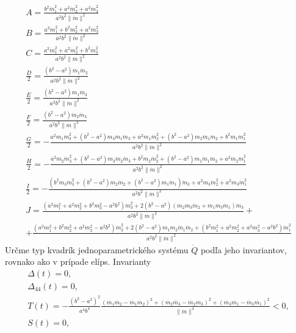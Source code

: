 \begin{gather*}
A = \frac{b^{2} \dot{m}_1^{2} + a^{2} \dot{m}_2^{2} + a^{2} \dot{m}_3^{2}}{a^2 b^2 \| \dot{m} \|^2} \\
B = \frac{a^{2} \dot{m}_1^{2} + b^{2} \dot{m}_2^{2} + a^{2} \dot{m}_3^{2}}{a^2 b^2 \| \dot{m} \|^2} \\
C = \frac{a^{2} \dot{m}_1^{2} + a^{2} \dot{m}_2^{2} + b^{2} \dot{m}_3^{2}}{a^2 b^2 \| \dot{m} \|^2}  \\ \frac{D}{2} = \frac{\left(b^2 - a^2\right)\dot{m}_1\dot{m}_2}{a^2b^2 \| \dot{m} \|^2}  \\
\frac{E}{2} = \frac{\left(b^2 - a^2\right)\dot{m}_1\dot{m}_3}{a^2b^2 \| \dot{m} \|^2} \\
\frac{F}{2} = \frac{\left(b^2 - a^2\right)\dot{m}_2\dot{m}_3}{a^2b^2 \| \dot{m} \|^2} \\
\frac{G}{2} = - \frac{ a^2 m_1 \dot{m}_3^2 + (b^2 - a^2) m_3 \dot{m}_1 \dot{m}_3 +  a^2 m_1 \dot{m}_2^2 + ( b^2 - a^2) m_2 \dot{m}_1 \dot{m}_2 + b^2 m_1 \dot{m}_1^2}{a^2b^2 \| \dot{m} \|^2} \\
\frac{H}{2} = - \frac{a^2 m_2 \dot{m}_3^2 + (b^2 - a^2) m_3 \dot{m}_2 \dot{m}_3 + b^2 m_2 \dot{m}_2^2 + (b^2 - a^2) m_1 \dot{m}_1 \dot{m}_2 + a^2 m_2 \dot{m}_1^2}{ a^2 b^2 \| \dot{m} \|^2 } \\
\frac{I}{2} = - \frac {(b^2 m_3 \dot{m}_3^2 + (b^2 - a^2) m_2 \dot{m}_2 + (b^2 - a^2) m_1 \dot{m}_1) \dot{m}_3 + a^2 m_3 \dot{m}_2^2 + a^2 m_3 \dot{m}_1^2}{a^2 b^2 \| \dot{m} \|^2 } \\
J = \frac{(a^2 m_1^2 + a^2 m_2^2 + b^2 m_3^2 - a^2 b^2) \dot{m}_3^2 + 2 (b^2 -a^2) (m_2 m_3 \dot{m}_2 + m_1 m_3 \dot{m}_1) \dot{m}_3 } {a^2 b^2 \|\dot{m} \|^2} + \\
+ \frac{(a^2 m_1^2 + b^2 m_2^2 + a^2 m_3^2 - a^2 b^2) \dot{m}_2^2 + 2 (b^2 - a^2) m_1 m_2 \dot{m}_1 \dot{m}_2 + (b^2 m_1^2 + a^2 m_2^2 + a^2 m_3^2 - a^2 b^2) \dot{m}_1^2}{a^2 b^2 \|\dot{m} \|^2}
\end{gather*}
Určme typ kvadrík jednoparametrického systému $\dot{Q}$ podľa jeho invariantov, rovnako ako v prípade elíps.
Invarianty
\begin{gather*}
\Delta (t) = 0, \\
\Delta_{44}(t) =0, \\
T(t) = - \frac{(b^2 - a^2)^2}{a^4b^4} \frac{ (\dot{m_1}\ddot{m_2} - \ddot{m_1}\dot{m_2})^2 + (\dot{m_2}\ddot{m_3} - \ddot{m_2}\dot{m_3})^2 + (\dot{m_3}\ddot{m_1} - \ddot{m_3}\dot{m_1})^2}{\|\dot{m}\|^4} < 0, \\
S(t) = 0,
\end{gather*}
